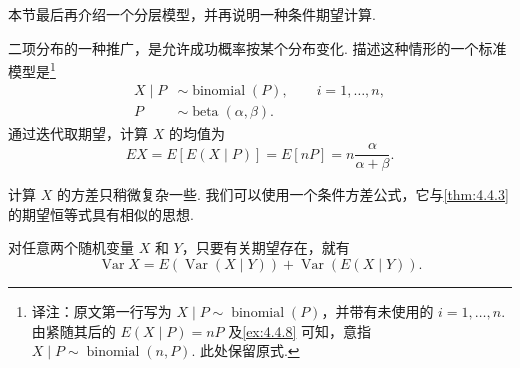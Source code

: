 本节最后再介绍一个分层模型，并再说明一种条件期望计算.
\begin{example}\label{ex:4.4.6}
二项分布的一种推广，是允许成功概率按某个分布变化. 描述这种情形的一个标准模型是\footnote{译注：原文第一行写为 $X\mid P\sim\operatorname{binomial}(P)$，并带有未使用的 $i=1,\ldots,n$. 由紧随其后的 $E(X\mid P)=nP$ 及\autoref{ex:4.4.8} 可知，意指 $X\mid P\sim\operatorname{binomial}(n,P)$. 此处保留原式.}
$$\begin{aligned}X\mid P&\sim\operatorname{binomial}(P),\qquad i=1,\ldots,n,\\P&\sim\operatorname{beta}(\alpha,\beta).\end{aligned}$$
通过迭代取期望，计算 $X$ 的均值为
$$EX=E[E(X\mid P)]=E[nP]=n\frac\alpha{\alpha+\beta}.$$
\end{example}
计算 $X$ 的方差只稍微复杂一些. 我们可以使用一个条件方差公式，它与\autoref{thm:4.4.3} 的期望恒等式具有相似的思想.
\begin{theorem}[条件方差恒等式]\label{thm:4.4.7}
对任意两个随机变量 $X$ 和 $Y$，只要有关期望存在，就有
\begin{equation}\label{eq:4.4.4}
\operatorname{Var}X=E(\operatorname{Var}(X\mid Y))+\operatorname{Var}(E(X\mid Y)).
\end{equation}
\end{theorem}
